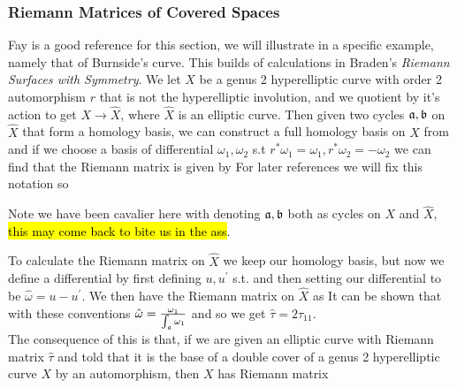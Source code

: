 \documentclass{article}
\begin{document}
\subsubsection{Riemann Matrices of Covered Spaces}
Fay \cite{Fay1973} is a good reference for this section, we will illustrate in a specific example, namely that of Burnside's curve. This builds of calculations in Braden's \textit{Riemann Surfaces with Symmetry}. We let $X$ be a genus 2 hyperelliptic curve with order 2 automorphism $r$ that is not the hyperelliptic involution, and we quotient by it's action to get $X \to \hat{X}$, where $\hat{X}$ is an elliptic curve. Then given two cycles $\mathfrak{a},\mathfrak{b}$ on $\hat{X}$ that form a homology basis, we can construct a full homology basis on $X$ from 
and if we choose a basis of differential $\omega_1, \omega_2$ s.t $r^\ast \omega_1 = \omega_1, r^\ast \omega_2 = -\omega_2$ we can find that the Riemann matrix is given by 
For later references we will fix this notation so 
\begin{remark}
	Note we have been cavalier here with denoting $\mathfrak{a},\mathfrak{b}$ both as cycles on $X$ and $\hat{X}$, \hl{this may come back to bite us in the ass}. 
\end{remark}
To calculate the Riemann matrix on $\hat{X}$ we keep our homology basis, but now we define a differential by first defining $u,u^\prime$ s.t. 
and then setting our differential to be $\hat{\omega} = u-u^\prime$. We then have the Riemann matrix on $\hat{X}$ as 
It can be shown that with these conventions $\hat{\omega} = \frac{\omega_1}{\int_{\mathfrak{a}} \omega_1}$ and so we get $\hat{\tau} = 2\tau_{11}$. \\
The consequence of this is that, if we are given an elliptic curve with Riemann matrix $\hat{\tau}$ and told that it is the base of a double cover of a genus 2 hyperelliptic curve $X$ by an automorphism, then $X$ has Riemann matrix 
\end{document}
